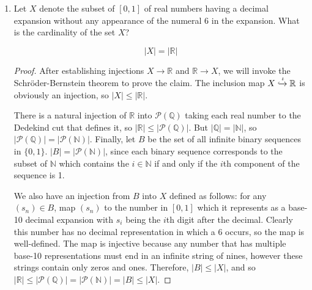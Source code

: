 \documentclass[10pt]{article}
\newcommand{\Q}{\mathbb{Q}}
\newcommand{\R}{\mathbb{R}}
\newcommand{\N}{\mathbb{N}}
\begin{document}
\begin{enumerate}
\item Let $X$ denote the subset of $[0,1]$ of real numbers having a decimal expansion without any appearance of the numeral $6$ in the expansion.  What is the cardinality of the set $X$?

$$|X| = |\R|$$

\begin{proof}
After establishing injections $X \rightarrow \R$ and $\R \rightarrow X$, we will invoke the Schr{\"o}der-Bernstein theorem to prove the claim.  The inclusion map $X \xhookrightarrow{\iota} \R$ is obviously an injection, so $|X| \leq |\R|$.

There is a natural injection of $\R$ into $\mathcal{P}(\Q)$ taking each real number to the Dedekind cut that defines it, so $|\R| \leq | \mathcal{P}(\Q)|$.  But $|\Q| = |\N|$, so $|\mathcal{P}(\Q)| = |\mathcal{P}(\N)|$.  Finally, let $B$ be the set of all infinite binary sequences in $\{0,1\}$.   $|B| = |\mathcal{P}(\N)|$, since each binary sequence corresponds to the subset of $\N$ which contains the $i \in \N$ if and only if the $i$th component of the sequence is 1.

We also have an injection from $B$ into $X$ defined as follows: for any $(s_n) \in B$, map $(s_n)$ to the number in $[0,1]$ which it represents as a base-10 decimal expansion with $s_i$ being the $i$th digit after the decimal.  Clearly this number has no decimal representation in which a 6 occurs, so the map is well-defined.  The map is injective because any number that has multiple base-10 representations must end in an infinite string of nines, however these strings contain only zeros and ones.  Therefore, $|B| \leq |X|$, and so $|\R| \leq | \mathcal{P}(\Q)| = |\mathcal{P}(\N)| = |B|\leq |X|$.
\end{proof}

\end{enumerate}
\end{document}
